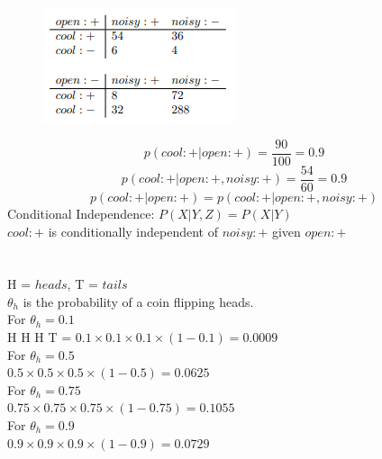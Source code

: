 \documentclass[12pt]{article}
\begin{document}
\section{}
\begin{figure}[h]
    \centering
    \includegraphics[width=0.4\linewidth]{Q5 Table.png}
\end{figure}
\[
p(cool:+|open:+)=\frac{90}{100}=0.9
\]
\[
p(cool:+|open:+,noisy:+)=\frac{54}{60}=0.9
\]
\[
p(cool:+|open:+)=p(cool:+|open:+,noisy:+)
\]
Conditional Independence: $P(X|Y,Z)=P(X|Y)$\\
$cool:+$ is conditionally independent of $noisy:+$ given $open:+$

\newpage
\section{}
H = $heads$, T = $tails$\\
$\theta_h$ is the probability of a coin flipping heads.\\
For $\theta_h = 0.1$\\
H H H T = $0.1 \times 0.1 \times 0.1 \times (1-0.1) = 0.0009$\\
For $\theta_h = 0.5$\\
$0.5 \times 0.5 \times 0.5 \times (1-0.5) = 0.0625$\\
For $\theta_h = 0.75$\\
$0.75 \times 0.75 \times 0.75 \times (1-0.75) = 0.1055$\\
For $\theta_h = 0.9$\\
$0.9 \times 0.9 \times 0.9 \times (1-0.9) = 0.0729$\\
\end{document}
